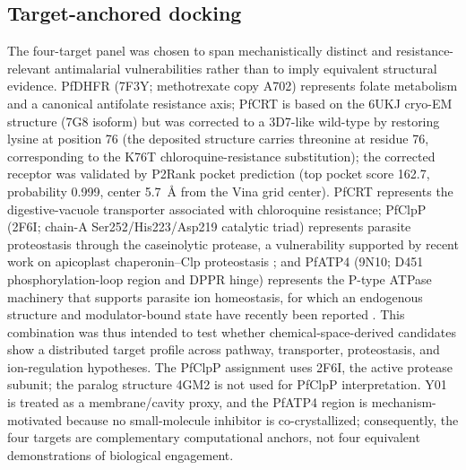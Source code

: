 \documentclass[journal=jcisd8,manuscript=article]{achemso}
\begin{document}
\subsection{Target-anchored docking}\label{sec:methods_docking}
The four-target panel was chosen to span mechanistically distinct and resistance-relevant antimalarial vulnerabilities rather than to imply equivalent structural evidence. PfDHFR (7F3Y; methotrexate copy A702) represents folate metabolism and a canonical antifolate resistance axis; PfCRT is based on the 6UKJ cryo-EM structure (7G8 isoform) but was corrected to a 3D7-like wild-type by restoring lysine at position 76 (the deposited structure carries threonine at residue 76, corresponding to the K76T chloroquine-resistance substitution); the corrected receptor was validated by P2Rank pocket prediction (top pocket score 162.7, probability 0.999, center \qty{5.7}{\angstrom} from the Vina grid center). PfCRT represents the digestive-vacuole transporter associated with chloroquine resistance; PfClpP (2F6I; chain-A Ser252/His223/Asp219 catalytic triad) represents parasite proteostasis through the caseinolytic protease, a vulnerability supported by recent work on apicoplast chaperonin--Clp proteostasis \cite{Tissawak2025}; and PfATP4 (9N10; D451 phosphorylation-loop region and DPPR hinge) represents the P-type ATPase machinery that supports parasite ion homeostasis, for which an endogenous structure and modulator-bound state have recently been reported \cite{Haile2025}. This combination was thus intended to test whether chemical-space-derived candidates show a distributed target profile across pathway, transporter, proteostasis, and ion-regulation hypotheses. The PfClpP assignment uses 2F6I, the active protease subunit; the paralog structure 4GM2 is not used for PfClpP interpretation. Y01 is treated as a membrane/cavity proxy, and the PfATP4 region is mechanism-motivated because no small-molecule inhibitor is co-crystallized; consequently, the four targets are complementary computational anchors, not four equivalent demonstrations of biological engagement.
\end{document}
